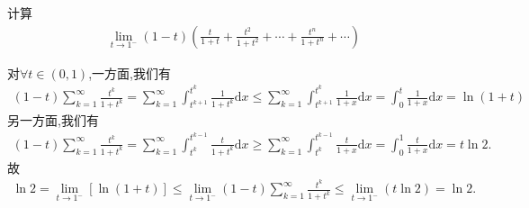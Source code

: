 \documentclass[../../main.tex]{subfiles}%
\begin{document}
\begin{example}
计算
\begin{align*}
\lim_{t\rightarrow 1^-} (1-t)\left( \frac{t}{1+t}+\frac{t^2}{1+t^2}+\cdots +\frac{t^n}{1+t^n}+\cdots \right)
\end{align*}
\end{example}
\begin{solution}
对$\forall t \in (0,1)$,一方面,我们有
\begin{align*}
\left( 1-t \right) \sum\limits_{k=1}^{\infty}{\frac{t^k}{1+t^k}}=\sum\limits_{k=1}^{\infty}{\int_{t^{k+1}}^{t^k}{\frac{1}{1+t^k}\mathrm{d}x}}\leqslant \sum\limits_{k=1}^{\infty}{\int_{t^{k+1}}^{t^k}{\frac{1}{1+x}\mathrm{d}x}}=\int_0^t{\frac{1}{1+x}\mathrm{d}x}=\ln \left( 1+t \right)
\end{align*}
另一方面,我们有
\begin{align*}
\left( 1-t \right) \sum\limits_{k=1}^{\infty}{\frac{t^k}{1+t^k}}=\sum\limits_{k=1}^{\infty}{\int_{t^k}^{t^{k-1}}{\frac{t}{1+t^k}\mathrm{d}x}}\geqslant \sum\limits_{k=1}^{\infty}{\int_{t^k}^{t^{k-1}}{\frac{t}{1+x}\mathrm{d}x}}=\int_0^1{\frac{t}{1+x}\mathrm{d}x}=t\ln 2.
\end{align*}
故
\begin{align*}
\ln 2=\lim_{t\rightarrow 1^-} \left[ \ln \left( 1+t \right) \right] \leqslant \lim_{t\rightarrow 1^-} \left( 1-t \right) \sum\limits_{k=1}^{\infty}{\frac{t^k}{1+t^k}}\leqslant \lim_{t\rightarrow 1^-} \left( t\ln 2 \right) =\ln 2.
\end{align*}

\end{solution}
\end{document}
